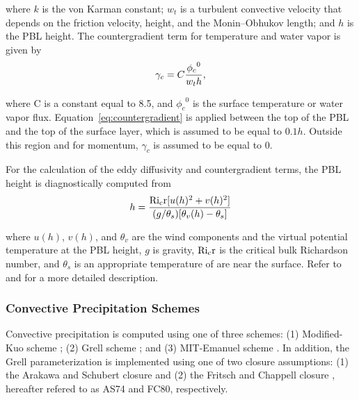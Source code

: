 \noindent
where $k$ is the von Karman constant; $w_t$ is a turbulent convective
velocity that depends on the friction velocity, height, and the 
Monin--Obhukov length;  and $h$ is the PBL height.  The 
countergradient term for temperature and water vapor is given by \\ 
\begin{eqnarray}  \label{eq:countergradient}
\gamma_c = C { {\phi_c}^0 \over w_t h},
\end{eqnarray}

\noindent
where C is a constant equal to 8.5, and ${\phi_c}^0$ is the surface
temperature or water vapor flux. Equation~\ref{eq:countergradient} is 
applied between the top of the PBL and the top of the surface layer, 
which is assumed to be equal to $0.1h$. Outside this region and for
momentum, $\gamma_c$ is assumed to be equal to 0.  

For the calculation of the eddy diffusivity and countergradient terms, the 
PBL height is diagnostically computed from \\
\begin{eqnarray}
h = { {\rm Ri_cr} [u(h)^2 + v(h)^2] \over 
(g/\theta_s)[\theta_v(h)-\theta_s] }
\end{eqnarray}

\noindent
where $u(h)$, $v(h)$, and $\theta_v$ are the wind components and the virtual
potential temperature at the PBL height, $g$ is gravity, ${\rm Ri_cr}$ is the 
critical bulk Richardson number, and $\theta_s$ is an appropriate 
temperature of are near the surface.  Refer to \cite{Holtslag_90} and 
\cite{Holtslag_93} for a more detailed description.


\subsubsection{Convective Precipitation Schemes}

Convective precipitation is computed using one of three schemes: (1) Modified-Kuo scheme \cite{Anthes_77};
(2) Grell scheme \cite{Grell_93}; 
and (3) MIT-Emanuel scheme \citep{Emanuel_91,Emanuel_99}. In addition, the Grell
parameterization is implemented using one of two closure assumptions:
(1) the Arakawa and Schubert closure \cite{Grell_94} and (2) 
the Fritsch and Chappell closure \cite{Fritsch_80}, 
hereafter refered to as AS74 and FC80, respectively.\\

